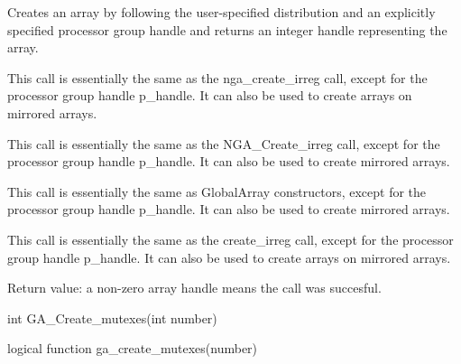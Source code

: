 \documentclass[12pt]{article}
\begin{document}
\dcoll

\begin{desc}

Creates an array by following the user-specified distribution and an explicitly
specified processor group handle and returns an integer handle representing the
array.
\end{desc}

\begin{fdesc}
This call is essentially the same as the nga_create_irreg call, except for the
processor group handle p_handle. It can also be used to create arrays on mirrored arrays.
\end{fdesc}

\begin{cdesc}
This call is essentially the same as the NGA_Create_irreg call, except for the
processor group handle p_handle. It can also be used to create mirrored arrays.
\end{cdesc}

\begin{cxxdesc}
This call is essentially the same as GlobalArray constructors, except for the
processor group handle p_handle. It can also be used to create mirrored arrays.
\end{cxxdesc}

\begin{pydesc}
This call is essentially the same as the create_irreg call, except for the
processor group handle p_handle. It can also be used to create arrays on mirrored arrays.
\end{pydesc}

\begin{desc}
Return value: a non-zero array handle means the call was succesful.

\end{desc}



\begin{capi}
\begin{ccode}
int GA_Create_mutexes(int number)
\end{ccode}
\begin{funcargs}
\end{funcargs}
\end{capi}

\begin{fapi}
\begin{fcode}
logical function ga_create_mutexes(number)
\end{fcode}
\begin{funcargs}
\end{funcargs}
\end{fapi}
\end{document}
